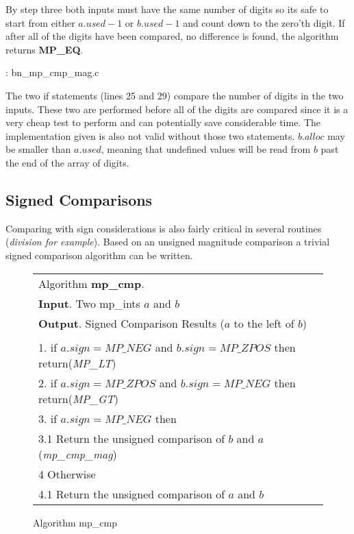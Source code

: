 \documentclass[b5paper]{book}
\begin{document}
By step three both inputs must have the same number of digits so its safe to start from either $a.used - 1$ or $b.used - 1$ and count down to
the zero'th digit.  If after all of the digits have been compared, no difference is found, the algorithm returns \textbf{MP\_EQ}.

\vspace{+3mm}\begin{small}
\hspace{-5.1mm}{\bf File}: bn\_mp\_cmp\_mag.c
\vspace{-3mm}
\begin{alltt}
\end{alltt}
\end{small}

The two if statements (lines 25 and 29) compare the number of digits in the two inputs.  These two are 
performed before all of the digits are compared since it is a very cheap test to perform and can potentially save 
considerable time.  The implementation given is also not valid without those two statements.  $b.alloc$ may be 
smaller than $a.used$, meaning that undefined values will be read from $b$ past the end of the array of digits.



\subsection{Signed Comparisons}
Comparing with sign considerations is also fairly critical in several routines (\textit{division for example}).  Based on an unsigned magnitude 
comparison a trivial signed comparison algorithm can be written.

\begin{figure}[here]
\begin{center}
\begin{tabular}{l}
\hline Algorithm \textbf{mp\_cmp}. \\
\textbf{Input}.   Two mp\_ints $a$ and $b$ \\
\textbf{Output}.  Signed Comparison Results ($a$ to the left of $b$) \\
\hline \\
1.  if $a.sign = MP\_NEG$ and $b.sign = MP\_ZPOS$ then return(\textit{MP\_LT}) \\
2.  if $a.sign = MP\_ZPOS$ and $b.sign = MP\_NEG$ then return(\textit{MP\_GT}) \\
3.  if $a.sign = MP\_NEG$ then \\
\hspace{+3mm}3.1  Return the unsigned comparison of $b$ and $a$ (\textit{mp\_cmp\_mag}) \\
4   Otherwise \\
\hspace{+3mm}4.1  Return the unsigned comparison of $a$ and $b$ \\
\hline
\end{tabular}
\end{center}
\caption{Algorithm mp\_cmp}
\end{figure}
\end{document}
